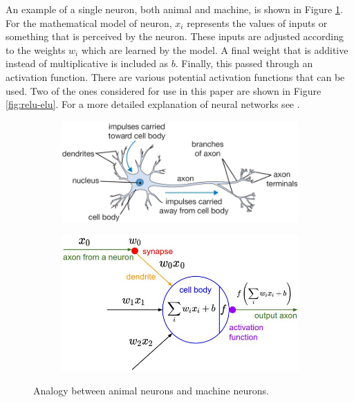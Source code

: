 \documentclass[../thesis.tex]{subfiles}
\begin{document}
\par An example of a single neuron, both animal and machine, is shown in Figure \ref{fig:neuron-cartoon}.
For the mathematical model of neuron, $x_i$ represents the values of inputs or something that is perceived by the neuron.
These inputs are adjusted according to the weights $w_i$ which are learned by the model.
A final weight that is additive instead of multiplicative is included as $b$.
Finally, this passed through an activation function.
There are various potential activation functions that can be used.
Two of the ones considered for use in this paper are shown in Figure \ref{fig:relu-elu}.
For a more detailed explanation of neural networks see \cite{neuron-cartoon}.
\begin{figure}[t]
	\centering
	\begin{subfigure}{0.49\textwidth}
		\includegraphics[width=\textwidth]{figures/neuron.png}
	\end{subfigure}
	\hfill
	\begin{subfigure}{0.49\textwidth}
		\includegraphics[width=\textwidth]{figures/neuron_model.jpeg}
	\end{subfigure}
	\caption{
	Analogy between animal neurons and machine neurons. \cite{neuron-cartoon}
	}
	\label{fig:neuron-cartoon}
\end{figure}
\end{document}
